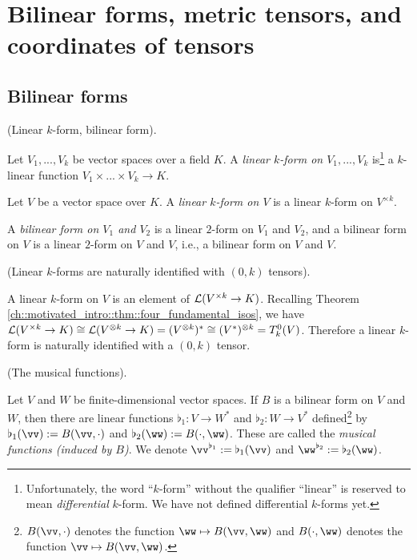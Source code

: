 \chapter{Bilinear forms, metric tensors, and coordinates of tensors}

\label{ch::bilinear_forms_metric_tensors}

\section{Bilinear forms}

\begin{defn}
\label{ch::bilinear_forms_metric_tensors::defn::linear_k_form}
    (Linear $k$-form, bilinear form).
    
    Let $V_1, ..., V_k$ be vector spaces over a field $K$. A \textit{linear $k$-form on $V_1, ..., V_k$} is\footnote{Unfortunately, the word ``$k$-form'' without the qualifier ``linear'' is reserved to mean \textit{differential} $k$-form. We have not defined differential $k$-forms yet.} a $k$-linear function ${V_1 \times ... \times V_k \rightarrow K}$.
    
    Let $V$ be a vector space over $K$. A \textit{linear $k$-form on $V$} is a linear $k$-form on $V^{\times k}$.
    
    A \textit{bilinear form on $V_1$ and $V_2$} is a linear $2$-form on $V_1$ and $V_2$, and a bilinear form on $V$ is a linear $2$-form on $V$ and $V$, i.e., a bilinear form on $V$ and $V$.
\end{defn}

\begin{remark}
\label{ch::bilinear_forms_metric_tensors::rmk::linear_k_forms_0_k_tensors}

    (Linear $k$-forms are naturally identified with $(0, k)$ tensors).
    
    A linear $k$-form on $V$ is an element of $\mathcal{L}(V^{\times k} \rightarrow K)$. Recalling Theorem \ref{ch::motivated_intro::thm::four_fundamental_isos}, we have $\mathcal{L}(V^{\times k} \rightarrow K) \cong \mathcal{L}(V^{\otimes k} \rightarrow K) = (V^{\otimes k})^* \cong (V^*)^{\otimes k} = T^0_k(V)$. Therefore a linear $k$-form is naturally identified with a $(0, k)$ tensor.
\end{remark}

\begin{defn}
\label{ch::bilinear_forms_metric_tensors::defn::nondegen_bilinear_form}
    (The musical functions).
    
    Let $V$ and $W$ be finite-dimensional vector spaces. If $B$ is a bilinear form on $V$ and $W$, then there are linear functions $\flat_1:V \rightarrow W^{*}$ and $\flat_2:W \rightarrow V^{*}$ defined\footnote{$B(\vv, \cdot)$ denotes the function $\ww \mapsto B(\vv, \ww)$ and $B(\cdot, \ww)$ denotes the function $\vv \mapsto B(\vv, \ww)$.} by $\flat_1(\vv) := B(\vv, \cdot)$ and $\flat_2(\ww) := B(\cdot, \ww)$. These are called the \textit{musical functions (induced by $B$)}. We denote $\vv^{\flat_1} := \flat_1(\vv)$ and $\ww^{\flat_2} := \flat_2(\ww)$.
\end{defn}

